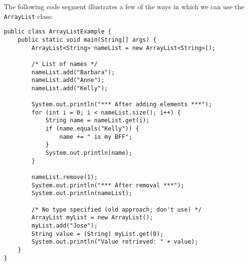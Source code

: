 The following code segment illustrates a few of the ways in which we can use the \verb!ArrayList! class:

\begin{lstlisting}
public class ArrayListExample {
	public static void main(String[] args) {
		ArrayList<String> nameList = new ArrayList<String>();

		/* List of names */
		nameList.add("Barbara");
		nameList.add("Anne");
		nameList.add("Kelly");

		System.out.println("*** After adding elements ***");
		for (int i = 0; i < nameList.size(); i++) {
			String name = nameList.get(i);
			if (name.equals("Kelly")) {
				name += " is my BFF";
			}
			System.out.println(name);
		}

		nameList.remove(1);
		System.out.println("*** After removal ***");
		System.out.println(nameList);

		/* No type specified (old approach; don't use) */
		ArrayList myList = new ArrayList();
		myList.add("Jose");
		String value = (String) myList.get(0);
		System.out.println("Value retrieved: " + value);
	}
}
\end{lstlisting}